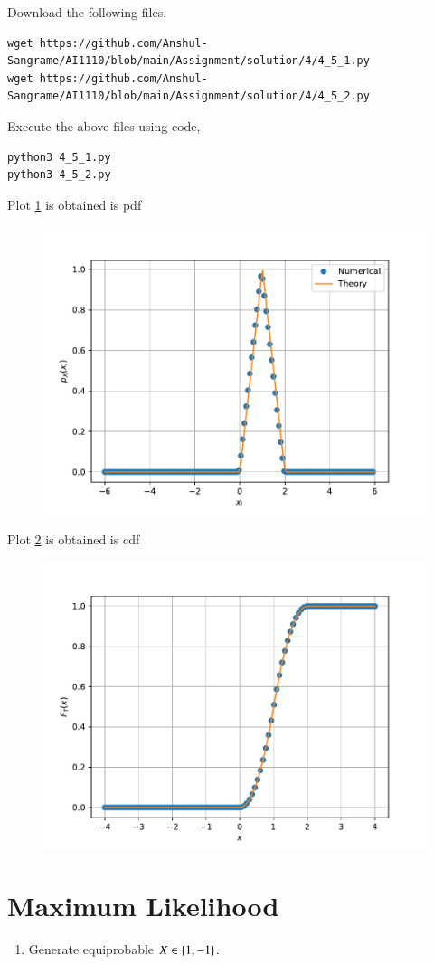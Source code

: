 \documentclass[journal,12pt,twocolumn]{IEEEtran}
\renewcommand\thesection{\arabic{section}}
\begin{document}
\begin{enumerate}[label=\thesection.\arabic*
,ref=\thesection.\theenumi]
\solution

Download the following files,
\begin{lstlisting}
wget https://github.com/Anshul-Sangrame/AI1110/blob/main/Assignment/solution/4/4_5_1.py
wget https://github.com/Anshul-Sangrame/AI1110/blob/main/Assignment/solution/4/4_5_2.py
\end{lstlisting}
Execute the above files using code,
\begin{lstlisting}
python3 4_5_1.py
python3 4_5_2.py
\end{lstlisting}
Plot \ref{fig:4.5.1} is obtained is pdf
\begin{figure}[!ht]
    \centering
    \includegraphics[width=\columnwidth]{../figs/tri_pdf.pdf}
    \caption{}
    \label{fig:4.5.1}
\end{figure}
Plot \ref{fig:4.5.2} is obtained is cdf
\begin{figure}[!ht]
    \centering
    \includegraphics[width=\columnwidth]{../figs/tri_cdf.pdf}
    \caption{}
    \label{fig:4.5.2}
\end{figure}
\end{enumerate}
%
%
\section{Maximum Likelihood}
%
\begin{enumerate}[label=\thesection.\arabic*
,ref=\thesection.\theenumi]
%
\item Generate equiprobable $X \in \left\{1, -1\right\}$.
%
\end{enumerate}
%
\end{document}
